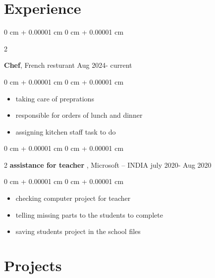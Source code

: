 \documentclass[10pt, letterpaper]{article}
\newenvironment{highlights}{
    \begin{itemize}[
        topsep=0.10 cm,
        parsep=0.10 cm,
        partopsep=0pt,
        itemsep=0pt,
        leftmargin=0 cm + 10pt
    ]
}{
    \end{itemize}
} %
\newenvironment{onecolentry}{
    \begin{adjustwidth}{
        0 cm + 0.00001 cm
    }{
        0 cm + 0.00001 cm
    }
}{
    \end{adjustwidth}
} %
\newenvironment{twocolentry}[2][]{
    \onecolentry
    \def\secondColumn{#2}
    \setcolumnwidth{\fill, 4.5 cm}
    \begin{paracol}{2}
}{
    \switchcolumn \raggedleft \secondColumn
    \end{paracol}
    \endonecolentry
} %
\begin{document}
    
    \section{Experience}



        
        \begin{twocolentry}{
            Aug 2024- current
        }
            \textbf{Chef}, French resturant \end{twocolentry}

        \vspace{0.10 cm}
        \begin{onecolentry}
            \begin{highlights}
                \item taking care of preprations 
                \item responsible for orders of lunch and dinner
                \item assigning kitchen staff task to do
            \end{highlights}
        \end{onecolentry}


        \vspace{0.2 cm}

        \begin{twocolentry}{
            july 2020- Aug 2020
} \textbf{ assistance for teacher }, Microsoft -- INDIA \end{twocolentry}

        \vspace{0.10 cm}
        \begin{onecolentry}
            \begin{highlights}
                \item checking computer project for teacher
                \item telling missing parts to the students to complete 
                \item saving students project in the school files
                
            \end{highlights}
        \end{onecolentry}



    
    
    
    \section{Projects}
\end{document}
